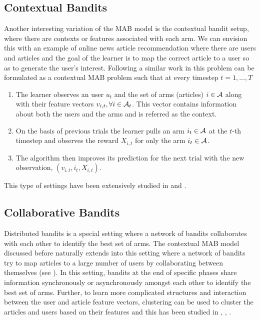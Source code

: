 \subsection{Contextual Bandits}

Another interesting variation of the MAB model is the contextual bandit setup, where there are contexts or features associated with each arm. We can envision this with an example of online news article recommendation where there are users and articles and the goal of the learner is to map the correct article to a user so as to generate the user's  interest. Following a similar work in \citet{langford2008epoch} this problem can be formulated as a contextual MAB problem such that at every timestep $t=1,\ldots, T$
\begin{enumerate}
\item The learner observes an user $u_t$ and the set of arms (articles) $i\in\mathcal{A}$ along with their feature vectors ${v}_{i,t},\forall i\in\mathcal{A}_t$. This vector contains information about both the users and the arms and is referred as the context.
\item On the basis of previous trials the learner pulls an arm $i_t\in\mathcal{A}$ at the $t$-th timestep and observes the reward $X_{i,t}$ for only the arm $i_t\in\mathcal{A}$.
\item The algorithm then improves its prediction for the next trial with the new observation, $\left(v_{i,t},i_{t}, X_{i,t} \right)$.
\end{enumerate}
This type of settings have been extensively studied in \citet{li2010contextual} and \citet{beygelzimer2011contextual}.

\subsection{Collaborative Bandits}

Distributed bandits is a special setting where a network of bandits collaborates with each other to identify the best set of arms. The contextual MAB model discussed before naturally extends into this setting where a network of bandits try to map articles to a large number of users by collaborating between themselves (see \citet{awerbuch2008competitive,liu2010distributed,szorenyi2013gossip,hillel2013distributed}). In this setting, bandits at the end of specific phases share information synchronously or asynchronously amongst each other to identify the best set of arms. Further, to learn more complicated structures and interaction between the user and article feature vectors, clustering can be used to cluster the articles and users based on their features and this has been studied in \citet{bui2012clustered}, \citet{cesa2013gang}, \citet{gentile2014online}.


